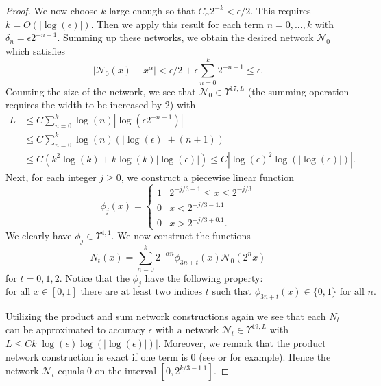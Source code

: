 \documentclass[twoside,11pt]{article}
\begin{document}
\begin{proof}
    We now choose $k$ large enough so that $C_\alpha 2^{-k} < \epsilon/2$. This requires $k = O(|\log(\epsilon)|)$. Then we apply this result for each term $n=0,...,k$ with $\delta_n = \epsilon 2^{-{n+1}}$. Summing up these networks, we obtain the desired network $\mathcal{N}_0$ which satisfies
    \begin{equation}
		|\mathcal{N}_0(x) - x^\alpha| < \epsilon/2 + \epsilon\sum_{n=0}^k 2^{-n+1} \leq \epsilon.
	\end{equation}
    Counting the size of the network, we see that $\mathcal{N}_0 \in \Upsilon^{17,L}$ (the summing operation requires the width to be increased by $2$) with
    \begin{equation}
    \begin{split}
        L &\leq C\sum_{n=0}^k \log(n)|\log(\epsilon 2^{-{n+1}})|\\ &\leq 
        C\sum_{n=0}^k \log(n)(|\log(\epsilon)| + (n+1))\\
        &\leq C(k^2\log(k) + k\log(k)|\log(\epsilon)|) \leq C|\log(\epsilon)^2\log(|\log(\epsilon)|)|.
    \end{split}
    \end{equation}
	Next, for each integer $j \geq 0$, we construct a piecewise linear function
	\begin{equation}
		\phi_j(x) = \begin{cases}
			1 & 2^{-j/3-1} \leq x \leq 2^{-j/3}\\
			0 & x < 2^{-j/3 - 1.1}\\
			0 & x > 2^{-j/3 + 0.1}.
		\end{cases}
	\end{equation}
	We clearly have $\phi_j\in \Upsilon^{4,1}$. We now construct the functions
	\begin{equation}\label{Nt-equation}
		N_t(x) = \sum_{n=0}^{k}2^{-\alpha n}\phi_{3n+t}(x)\mathcal{N}_0(2^n x)
	\end{equation}
	for $t=0,1,2$. Notice that the $\phi_j$ have the following property:
    \begin{equation}\label{phis-overlap-property}
        \text{for all $x\in [0,1]$ there are at least two indices $t$ such that $\phi_{3n+t}(x)\in \{0,1\}$ for all $n$.}
    \end{equation}

    Utilizing the product  and sum network constructions again we see that each $N_t$ can be approximated to accuracy $\epsilon$ with a network $\mathcal{N}_t\in\Upsilon^{19,L}$ with $L\leq Ck|\log(\epsilon)\log(|\log(\epsilon)|)|$. Moreover, we remark that the product network construction is exact if one term is $0$ (see \cite{yarotsky2017error} or \cite{siegel2023optimal} for example). Hence the network $\mathcal{N}_t$ equals $0$ on the interval $[0,2^{k/3-1.1}]$. 
    

\end{proof}
\end{document}
